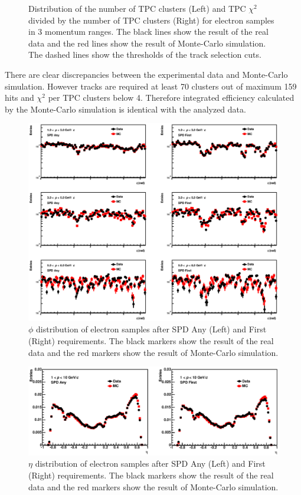 {\begin{figure}[!h]
  \caption{Distribution of the number of TPC clusters (Left) and TPC $\chi^{2}$ divided by the number of TPC clusters (Right) for electron samples in 3 momentum ranges. The black lines show the result of the real data and the red lines show the result of Monte-Carlo simulation. The dashed lines show the thresholds of the track selection cuts.}
  \label{fig_4_qa_tpc}
\end{figure}
There are clear discrepancies between the experimental data and Monte-Carlo simulation. 
However tracks are required at least 70 clusters out of maximum 159 hits and $\chi^{2}$ per TPC clusters below 4. 
Therefore integrated efficiency calculated by the Monte-Carlo simulation is identical with the analyzed data.
\begin{figure}[!h]
  \centering
  \includegraphics[width=15cm]{chap4/figure/TrackQA/Phi_tof3_tpc2_tpcpi3_MB.eps}
  \caption{$\phi$ distribution of electron samples after SPD Any (Left) and First (Right) requirements. The black markers show the result of the real data and the red markers show the result of Monte-Carlo simulation.}
  \label{fig_4_qa_phi}
\end{figure}

\begin{figure}[!h]
  \centering
  \includegraphics[width=15cm]{chap4/figure/TrackQA/Eta_tof3_tpc2_tpcpi3_MB.eps}
  \caption{$\eta$ distribution of electron samples after SPD Any (Left) and First (Right) requirements. The black markers show the result of the real data and the red markers show the result of Monte-Carlo simulation.}
  \label{fig_4_qa_eta}
\end{figure}

}
